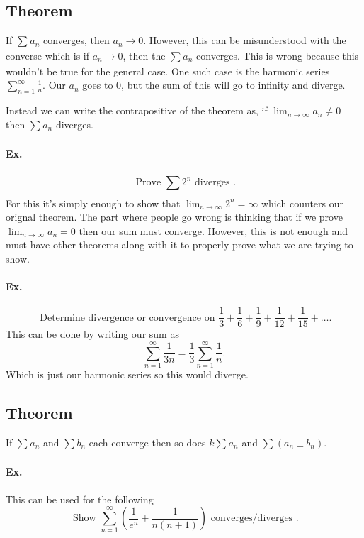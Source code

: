 \subsection{Theorem}%
\label{sub:Theorem}
If $ \sum_{  } ^{  } a_n $ converges, then $ a_n \to 0 $. However, this can be misunderstood with the converse which is if $ a_n \to 0$, then the $ \sum_{  } ^{  } a_n $ converges. This is wrong because this wouldn't be true for the general case. One such case is the harmonic series $ \sum_{ n=1 } ^{ \infty } \frac{ 1 }{ n }  $. Our $ a_n $ goes to 0, but the sum of this will go to infinity and diverge.

Instead we can write the contrapositive of the theorem as, if $ \lim_{ n \to \infty} a_n \neq  0 $ then $ \sum_{  } ^{  } a_n $ diverges. 

\paragraph{Ex.}%
\label{par:Ex.}
\[
\text{ Prove }\sum_{  } ^{  } 2^{ n }\text{ diverges }
.\] 
For this it's simply enough to show that $ \lim_{ n \to \infty} 2^{ n }=\infty $ which counters our orignal theorem. The part where people go wrong is thinking that if we prove $ \lim_{ n \to \infty} a_n = 0 $ then our sum must converge. However, this is not enough and must have other theorems along with it to properly prove what we are trying to show. 
\paragraph{Ex.}
\[
\text{ Determine divergence or convergence on }\frac{ 1 }{ 3 } +\frac{ 1 }{ 6 } +\frac{ 1 }{ 9 } +\frac{ 1 }{ 12 } +\frac{ 1 }{ 15 } +\ldots
.\]
This can be done by writing our sum as 
\[
\sum_{ n=1 } ^{ \infty } \frac{ 1 }{ 3n } = \frac{ 1 }{ 3 } \sum_{ n=1 } ^{ \infty } \frac{ 1 }{ n } 
.\] 
Which is just our harmonic series so this would diverge.

\subsection{Theorem}%
\label{sub:Theorem}
If $ \sum_{  } ^{  } a_n $ and $ \sum_{  } ^{  } b_n $ each converge then so does $ k\sum_{  } ^{  } a_n $ and $ \sum_{  } ^{  } \left(   a_n \pm b_n \right)$. 
\paragraph{Ex.}
This can be used for the following
\[
\text{ Show }\sum_{ n=1 } ^{ \infty } \left( \frac{ 1 }{ e^{ n } } +\frac{ 1 }{ n\left( n+1 \right)  }  \right) \text{ converges/diverges }
.\] 

